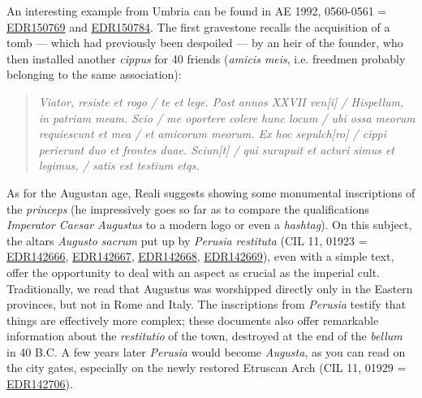 \documentclass[amsthm,ebook]{saparticle}
\begin{document}
An interesting example from Umbria can be found in AE 1992, 0560-0561 = \href{http://www.edr-edr.it/edr\_programmi/res\_complex\_comune.php?do=book\&id\_nr=EDR150769}{EDR150769} and \href{http://www.edr-edr.it/edr\_programmi/res\_complex\_comune.php?do=book\&id\_nr=EDR150784}{EDR150784}. The first gravestone
recalls the acquisition of a tomb --- which had previously been despoiled --- by an heir of the founder, who then installed
another \emph{cippus} for 40 friends (\emph{amicis meis}, i.e. freedmen probably belonging to the same association):
\begin{quotation}

\emph{Viator, resiste et rogo / te et lege. Post annos XXVII ven[i] / Hispellum, in patriam meam. Scio / me oportere colere
hunc locum / ubi ossa meorum requiescunt et mea / et amicorum meorum. Ex hoc sepulch[ro] / cippi perierunt duo et
frontes duae. Sciun[t] / qui surupuit et acturi simus et legimus, / satis est testium etqs.}

\end{quotation}
As for the Augustan age, Reali suggests showing some monumental inscriptions of the \emph{princeps} (he impressively goes so
far as to compare the qualifications \emph{Imperator Caesar Augustus} to a modern logo or even a \emph{hashtag}). On
this subject, the altars \emph{Augusto sacrum} put up by \emph{Perusia restituta} (CIL 11, 01923 = \href{http://www.edr-edr.it/edr\_programmi/res\_complex\_comune.php?do=book\&id\_nr=EDR142666}{EDR142666}, \href{http://www.edr-edr.it/edr\_programmi/res\_complex\_comune.php?do=book\&id\_nr=EDR142667}{EDR142667}, \href{http://www.edr-edr.it/edr\_programmi/res\_complex\_comune.php?do=book\&id\_nr=EDR142668}{EDR142668},
\href{http://www.edr-edr.it/edr\_programmi/res\_complex\_comune.php?do=book\&id\_nr=EDR142669}{EDR142669}), even with a simple text, offer the opportunity to deal with an aspect as crucial as the imperial cult.
Traditionally, we read that Augustus was worshipped directly only in the Eastern provinces, but not in Rome and Italy.
The inscriptions from \emph{Perusia} testify that things are effectively more complex; these documents also offer remarkable
information about the \emph{restitutio} of the town, destroyed at the end of the \emph{bellum} in 40 B.C. A few years later \emph{Perusia}
would become \emph{Augusta}, as you can read on the city gates, especially on the newly restored Etruscan Arch (CIL 11, 01929
= \href{http://www.edr-edr.it/edr\_programmi/res\_complex\_comune.php?do=book\&id\_nr=EDR142706}{EDR142706}).
\end{document}
